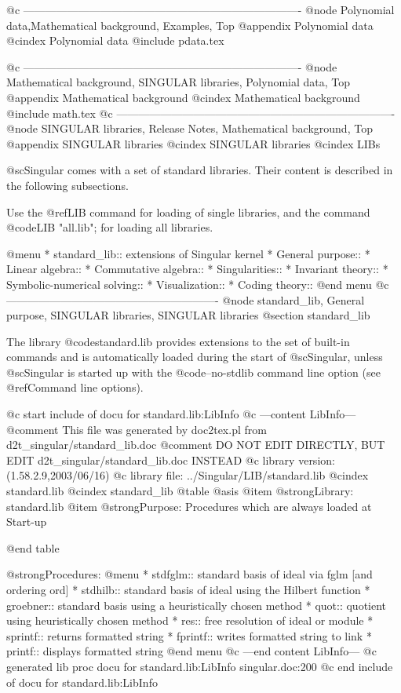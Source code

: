@c ----------------------------------------------------------------------------
@node Polynomial data,Mathematical background, Examples, Top
@appendix Polynomial data
@cindex Polynomial data
@include pdata.tex

@c ----------------------------------------------------------------------------
@node Mathematical background, SINGULAR libraries, Polynomial data, Top
@appendix Mathematical background
@cindex Mathematical background
@include math.tex
@c ----------------------------------------------------------------------------
@node SINGULAR libraries, Release Notes, Mathematical background, Top
@appendix SINGULAR libraries
@cindex SINGULAR libraries
@cindex LIBs

@sc{Singular} comes with a set of standard libraries. Their content is
described in the following subsections.

Use the @ref{LIB} command for loading of single libraries, and the
command @code{LIB "all.lib";} for loading all libraries.

@menu
* standard_lib:: extensions of Singular kernel
* General purpose::
* Linear algebra::
* Commutative algebra::
* Singularities::
* Invariant theory::
* Symbolic-numerical solving::
* Visualization::
* Coding theory::
@end menu
@c ----------------------------------------------------------
@node standard_lib, General purpose, SINGULAR libraries, SINGULAR libraries
@section standard_lib

The library @code{standard.lib} provides extensions to the
set of built-in commands and is automatically loaded
during the start of @sc{Singular}, unless @sc{Singular} is started up
with the @code{--no-stdlib} command line option (see
@ref{Command line options}).

@c start include of docu for standard.lib:LibInfo
@c ---content LibInfo---
@comment This file was generated by doc2tex.pl from d2t_singular/standard_lib.doc
@comment DO NOT EDIT DIRECTLY, BUT EDIT d2t_singular/standard_lib.doc INSTEAD
@c library version: (1.58.2.9,2003/06/16)
@c library file: ../Singular/LIB/standard.lib
@cindex standard.lib
@cindex standard_lib
@table @asis
@item @strong{Library:}
standard.lib
@item @strong{Purpose:}
   Procedures which are always loaded at Start-up

@end table

@strong{Procedures:}
@menu
* stdfglm:: standard basis of ideal via fglm [and ordering ord]
* stdhilb:: standard basis of ideal using the Hilbert function
* groebner:: standard basis using a heuristically chosen method
* quot:: quotient using heuristically chosen method
* res:: free resolution of ideal or module
* sprintf:: returns formatted string
* fprintf:: writes formatted string to link
* printf:: displays formatted string
@end menu
@c ---end content LibInfo---
@c generated lib proc docu for standard.lib:LibInfo singular.doc:200 
@c end include of docu for standard.lib:LibInfo


